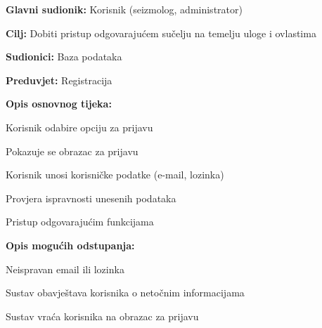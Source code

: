					\noindent {}
					\begin{packed_item}
	
						\item \textbf{Glavni sudionik:} Korisnik (seizmolog, administrator)
						\item \textbf{Cilj:} Dobiti pristup odgovarajućem sučelju na temelju uloge i ovlastima
						\item \textbf{Sudionici:} Baza podataka
						\item \textbf{Preduvjet:} Registracija
						\item \textbf{Opis osnovnog tijeka:}
						
						\item[] \begin{packed_enum}
	
							\item Korisnik odabire opciju za prijavu
							\item Pokazuje se obrazac za prijavu
							\item Korisnik unosi korisničke podatke (e-mail, lozinka)
							\item Provjera ispravnosti unesenih podataka
							\item Pristup odgovarajućim funkcijama
						\end{packed_enum}
						
						\item  \textbf{Opis mogućih odstupanja:}
						
						\item[] \begin{packed_item}
	
							\item[4.a] Neispravan email ili lozinka
							\item[] \begin{packed_enum}
								
								\item Sustav obavještava korisnika o netočnim informacijama
								\item Sustav vraća korisnika na obrazac za prijavu
								
							\end{packed_enum}
							
						\end{packed_item}
					\end{packed_item}

